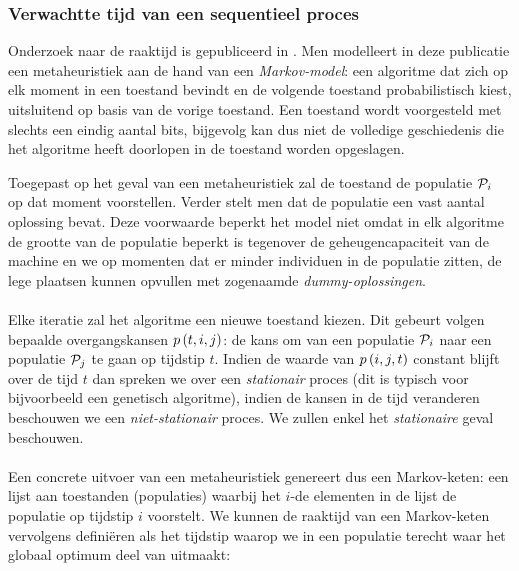 \subsubsection{Verwachtte tijd van een sequentieel proces}

Onderzoek naar de raaktijd is gepubliceerd in \cite{DBLP:journals/jc/ShonkwilerV94}. Men modelleert in deze publicatie een metaheuristiek aan de hand van een \emph{Markov-model}: een algoritme dat zich op elk moment in een toestand bevindt en de volgende toestand probabilistisch kiest, uitsluitend op basis van de vorige toestand. Een toestand wordt voorgesteld met slechts een eindig aantal bits, bijgevolg kan dus niet de volledige geschiedenis die het algoritme heeft doorlopen in de toestand worden opgeslagen.

Toegepast op het geval van een metaheuristiek zal de toestand de populatie $\mathcal{P}_i$ op dat moment voorstellen. Verder stelt men dat de populatie een vast aantal oplossing bevat. Deze voorwaarde beperkt het model niet omdat in elk algoritme de grootte van de populatie beperkt is tegenover de geheugencapaciteit van de machine en we op momenten dat er minder individuen in de populatie zitten, de lege plaatsen kunnen opvullen met zogenaamde \emph{dummy-oplossingen}.
\paragraph{}
Elke iteratie zal het algoritme een nieuwe toestand kiezen. Dit gebeurt volgen bepaalde overgangskansen $p\left(t,i,j\right)$: de kans om van een populatie $\mathcal{P}_i$ naar een populatie $\mathcal{P}_j$ te gaan op tijdstip $t$. Indien de waarde van $p\left(i,j,t\right)$ constant blijft over de tijd $t$ dan spreken we over een \emph{stationair} proces (dit is typisch voor bijvoorbeeld een genetisch algoritme), indien de kansen in de tijd veranderen beschouwen we een \emph{niet-stationair} proces. We zullen enkel het \emph{stationaire} geval beschouwen.

\paragraph{}
Een concrete uitvoer van een metaheuristiek genereert dus een Markov-keten: een lijst aan toestanden (populaties) waarbij het $i$-de elementen in de lijst de populatie op tijdstip $i$ voorstelt. We kunnen de raaktijd van een Markov-keten vervolgens defini\"eren als het tijdstip waarop we in een populatie terecht waar het globaal optimum deel van uitmaakt:

